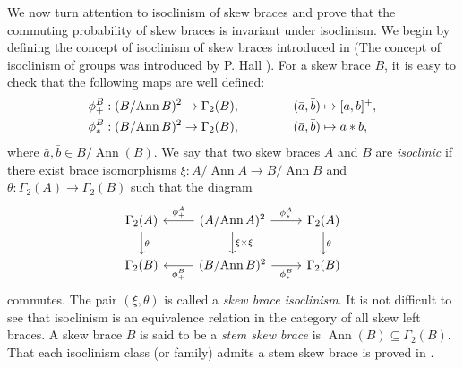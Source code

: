 \documentclass[oneside]{amsart}
\numberwithin{equation}{section}
\theoremstyle{plain}
\theoremstyle{definition}
\newcommand{\Ann}{\operatorname{Ann} }
\begin{document}
We now turn attention to isoclinism of skew braces and prove that the commuting probability of skew braces is invariant under isoclinism.
We begin  by defining the concept of isoclinism of skew  braces introduced in \cite{LV23}  (The concept of isoclinism of groups was introduced by P. Hall \cite{Hall40}). For a skew  brace $B$, it is easy to check that the following maps are well defined:
\begin{align*}
\phi^B_{+}&:(B/{\Ann B})^2\to \Gamma_2(B), \hspace{1.5cm}(\bar{a},\bar{b})\mapsto [a,b]^{+},\\
\phi^B_\ast&:(B/{\Ann B})^2\to \Gamma_2(B),\hspace{1.5cm}(\bar{a},\bar{b})\mapsto a\ast b,
\end{align*}
where $\bar{a}, \bar{b} \in B/\Ann(B)$. 
We say that two skew  braces $A$ and $B$ are {\em isoclinic} if there exist  brace isomorphisms $\xi : A/{\Ann A} \to B/{\Ann B}$ and $\theta : \Gamma_2(A) \to \Gamma_2(B)$ such that the diagram
\begin{equation}\label{dia:isoclinism}
\begin{tikzcd}
\Gamma_2(A) \arrow[d,"\theta"] &(A/{\Ann A})^2\arrow[l,"\phi_{+}^A"']\arrow[r,"\phi_\ast^A"]\arrow[d,"\xi \times \xi"] &\Gamma_2(A) \arrow[d,"\theta"]\\
\Gamma_2(B) &(B/{\Ann B})^2\arrow[l,"\phi_{+}^B"]\arrow[r,"\phi_\ast^B"'] & \Gamma_2(B)
\end{tikzcd}
\end{equation}
commutes. The pair $(\xi,\theta)$ is called a  {\em skew  brace  isoclinism}. It is not difficult to see that isoclinism is an equivalence relation in the category of all skew left braces.  A skew brace $B$ is said to be a {\it stem skew brace} is $ \Ann(B)  \subseteq \Gamma_2(B) $. That each isoclinism class (or family) admits a stem skew brace is proved in \cite[Theorem 2.18]{LV23}.
\end{document}
